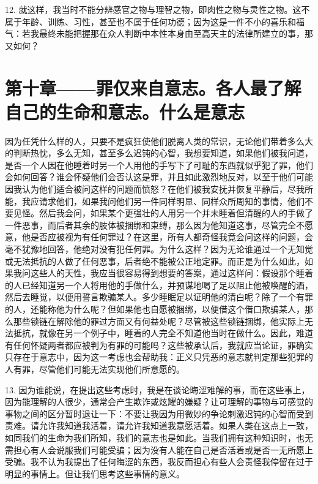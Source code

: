 12. 就这样，我当时不能分辨感官之物与理智之物，即肉性之物与灵性之物。这不属于年龄、训练、习性，甚至也不属于任何功德；因为这是一件不小的喜乐和福气：若我最终未能把握那在众人判断中本性本身由至高天主的法律所建立的事，那又如何？\par


\section{第十章——罪仅来自意志。各人最了解自己的生命和意志。什么是意志}

因为任凭什么样的人，只要不是疯狂使他们脱离人类的常识，无论他们带着多么大的判断热忱，多么无知，甚至多么迟钝的心智，我想要知道，如果他们被我问道，是否一个人因在他睡着时另一个人用他的手写下了可耻的东西就似乎犯了罪，他们会如何回答？谁会怀疑他们会否认这是罪，并且如此激烈地反对，以至于他们可能因我认为他们适合被问这样的问题而愤怒？在他们被我安抚并恢复平静后，尽我所能，我应请求他们，如果我问他们另一件同样明显、同样众所周知的事情，他们不要见怪。然后我会问，如果某个更强壮的人用另一个并未睡着但清醒的人的手做了一件恶事，而后者其余的肢体被捆绑和束缚，那么因为他知道这事，尽管完全不愿意，他是否应被视为有任何罪过？在这里，所有人都奇怪我竟会问这样的问题，会毫不犹豫地回答，他绝对没有犯任何罪。为什么这样？因为无论谁通过一个无知觉或无法抵抗的人做了任何恶事，后者绝不能被公正地定罪。而正是为什么如此，如果我问这些人的天性，我应当很容易得到想要的答案，通过这样问：假设那个睡着的人已经知道另一个人将用他的手做什么，并预谋地喝了足以阻止他被唤醒的酒，然后去睡觉，以便用誓言欺骗某人。多少睡眠足以证明他的清白呢？除了一个有罪的人，还能称他为什么呢？但如果他也自愿被捆绑，以便借这个借口欺骗某人，那么那些锁链在解除他的罪过方面又有何益处呢？尽管被这些锁链捆绑，他实际上无法抵抗，就像在另一个例子中，睡着的人完全不知道他当时在做什么。因此，难道有任何怀疑两者都应被判为有罪的可能吗？这些被承认后，我就应当论证，罪确实只存在于意志中，因为这一考虑也会帮助我：正义只凭恶的意志就判定那些犯罪的人有罪，尽管他们可能无法实现他们所意愿的。\par

13. 因为谁能说，在提出这些考虑时，我是在谈论晦涩难解的事，而在这些事上，因为能理解的人很少，通常会产生欺诈或炫耀的嫌疑？让可理解的事物与可感觉的事物之间的区分暂时退让一下：不要让我因为用微妙的争论刺激迟钝的心智而受到责难。请允许我知道我活着，请允许我知道我意愿活着。如果人类在这点上一致，如同我们的生命为我们所知，我们的意志也是如此。当我们拥有这种知识时，也无需担心有人会说服我们可能受骗；因为没有人能在自己是否活着或是否一无所愿上受骗。我不认为我提出了任何晦涩的东西，我反而担心有些人会责怪我停留在过于明显的事情上。但让我们思考这些事情的意义。\par

